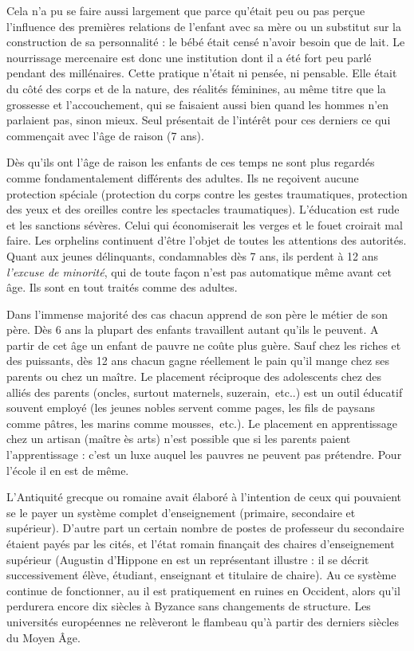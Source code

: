  Cela n'a pu se faire aussi largement que parce qu'était peu ou pas perçue l'influence des premières relations de l'enfant avec sa mère ou un substitut sur la construction de sa personnalité : le bébé était censé n'avoir besoin que de lait. Le nourrissage mercenaire est donc une institution dont il a été fort peu parlé pendant des millénaires. Cette pratique n'était ni pensée, ni pensable. Elle était du côté des corps et de la nature, des réalités féminines, au même titre que la grossesse et l'accouchement, qui se faisaient aussi bien quand les hommes n'en parlaient pas, sinon mieux. Seul présentait de l'intérêt pour ces derniers ce qui commençait avec l'âge de raison (7 ans).

 Dès qu'ils ont l'âge de raison les enfants de ces temps ne sont plus regardés comme fondamentalement différents des adultes. Ils ne reçoivent aucune protection spéciale (protection du corps contre les gestes traumatiques, protection des yeux et des oreilles contre les spectacles traumatiques). L'éducation est rude et les sanctions sévères. Celui qui économiserait les verges et le fouet croirait mal faire. Les orphelins continuent d'être l'objet de toutes les attentions des autorités. Quant aux jeunes délinquants, condamnables dès 7 ans, ils perdent à 12 ans \emph{l'excuse de minorité}, qui de toute façon n'est pas automatique même avant cet âge. Ils sont en tout traités comme des adultes.

 Dans l'immense majorité des cas chacun apprend de son père le métier de son père. Dès 6 ans la plupart des enfants travaillent autant qu'ils le peuvent. A partir de cet âge un enfant de pauvre ne coûte plus guère. Sauf chez les riches et des puissants, dès 12 ans chacun gagne réellement le pain qu'il mange chez ses parents ou chez un maître. Le placement réciproque des adolescents chez des alliés des parents (oncles, surtout maternels, suzerain,~etc..) est un outil éducatif souvent employé (les jeunes nobles servent comme pages, les fils de paysans comme pâtres, les marins comme mousses,~etc.). Le placement en apprentissage chez un artisan (maître ès arts) n'est possible que si les parents paient l'apprentissage : c'est un luxe auquel les pauvres ne peuvent pas prétendre. Pour l'école il en est de même. 

 L'Antiquité grecque ou romaine avait élaboré à l'intention de ceux qui pouvaient se le payer un système complet d'enseignement (primaire, secondaire et supérieur). D'autre part un certain nombre de postes de professeur du secondaire étaient payés par les cités, et l'état romain finançait des chaires d'enseignement supérieur (Augustin d'Hippone en est un représentant illustre : il se décrit successivement élève, étudiant, enseignant et titulaire de chaire). Au  ce système continue de fonctionner, au  il est pratiquement en ruines en Occident, alors qu'il perdurera encore dix siècles à Byzance sans changements de structure. Les universités européennes ne relèveront le flambeau qu'à partir des derniers siècles du Moyen Âge. 

